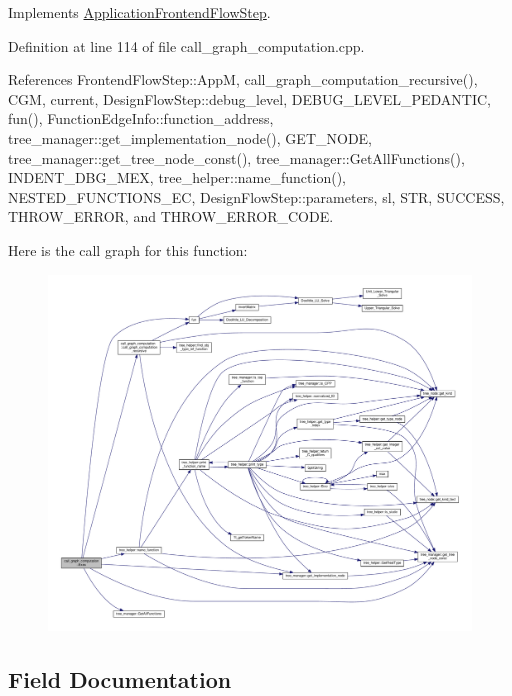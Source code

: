 Implements \hyperlink{classApplicationFrontendFlowStep_a2bf060a5ebc1735635dc5c7773387a25}{Application\+Frontend\+Flow\+Step}.



Definition at line 114 of file call\+\_\+graph\+\_\+computation.\+cpp.



References Frontend\+Flow\+Step\+::\+AppM, call\+\_\+graph\+\_\+computation\+\_\+recursive(), C\+GM, current, Design\+Flow\+Step\+::debug\+\_\+level, D\+E\+B\+U\+G\+\_\+\+L\+E\+V\+E\+L\+\_\+\+P\+E\+D\+A\+N\+T\+IC, fun(), Function\+Edge\+Info\+::function\+\_\+address, tree\+\_\+manager\+::get\+\_\+implementation\+\_\+node(), G\+E\+T\+\_\+\+N\+O\+DE, tree\+\_\+manager\+::get\+\_\+tree\+\_\+node\+\_\+const(), tree\+\_\+manager\+::\+Get\+All\+Functions(), I\+N\+D\+E\+N\+T\+\_\+\+D\+B\+G\+\_\+\+M\+EX, tree\+\_\+helper\+::name\+\_\+function(), N\+E\+S\+T\+E\+D\+\_\+\+F\+U\+N\+C\+T\+I\+O\+N\+S\+\_\+\+EC, Design\+Flow\+Step\+::parameters, sl, S\+TR, S\+U\+C\+C\+E\+SS, T\+H\+R\+O\+W\+\_\+\+E\+R\+R\+OR, and T\+H\+R\+O\+W\+\_\+\+E\+R\+R\+O\+R\+\_\+\+C\+O\+DE.

Here is the call graph for this function\+:
\nopagebreak
\begin{figure}[H]
\begin{center}
\leavevmode
\includegraphics[width=350pt]{d3/d6f/classcall__graph__computation_a59dbe3059afb5101f03f746b52e49d0e_cgraph}
\end{center}
\end{figure}


\subsection{Field Documentation}
\mbox{\label{classcall__graph__computation_add82c2da1d89c88376c84c30415e94d1}} 
